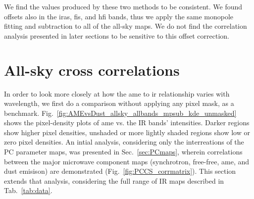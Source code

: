       We find the values produced by these two methods to be consistent. We found offsets also in the \acrshort{iras}, \acrshort{fis}, and \acrshort{hfi} bands, thus we apply the same monopole fitting and subtraction to all of the all-sky maps. We do not find the correlation analysis presented in later sections to be sensitive to this offset correction.

  \section{All-sky cross correlations}
        In order to look more closely at how the \acrshort{ame} to \acrshort{ir} relationship varies with wavelength, we first do a comparison without applying any pixel mask, as a benchmark. Fig.~\ref{fig:AMEvsDust_allsky_allbands_mpsub_kde_unmasked} shows the pixel-density plots of \acrshort{ame} vs. the IR bands' intensities. Darker regions show higher pixel densities, unshaded or more lightly shaded regions show low or zero pixel densities. An intial analysis, considering only the interreations of the PC parameter maps, was presented in Sec.~\ref{sec:PCmaps}, wherein correlations between the major microwave component maps (synchrotron, free-free, \acrshort{ame}, and dust emisison) are demonstrated (Fig.~\ref{fig:PCCS_corrmatrix}). This section extends that analysis, considering the full range of IR maps described in Tab.~\ref{tab:data}.

